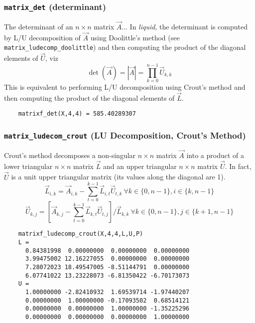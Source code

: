 \subsubsection{{\tt matrix\_det} (determinant)}
\label{module:matrix:det}
The determinant of an $n \times n$ matrix $\vec{A}$...
In {\it liquid}, the determinant is computed by L/U decomposition of $\vec{A}$
using Doolittle's method (see {\tt matrix\_ludecomp\_doolittle}) and then
computing the product of the diagonal elements of $\vec{U}$, viz
\[
    \det\left(\vec{A}\right) =
    \left|\vec{A}\right| =
    \prod_{k=0}^{n-1}{\vec{U}_{k,k}}
\]
This is equivalent to performing L/U decomposition using Crout's method and
then computing the product of the diagonal elements of $\vec{L}$.
\begin{verbatim}
    matrixf_det(X,4,4) = 585.40289307
\end{verbatim}

\subsubsection{{\tt matrix\_ludecom\_crout} (LU Decomposition, Crout's Method)}
\label{module:matrix:ludecomp_crout}
Crout's method decomposes a non-singular $n\times n$ matrix $\vec{A}$ into a
product of a lower triangular $n \times n$ matrix $\vec{L}$ and an upper
triangular $n \times n$ matrix $\vec{U}$. %
In fact, $\vec{U}$ is a unit upper triangular matrix (its values along the
diagonal are 1).
%
\[
    \vec{L}_{i,k} = \vec{A}_{i,k} -
                    \sum_{t=0}^{k-1}{ \vec{L}_{i,t} \vec{U}_{t,k} }
                    \ \forall k \in \{0,n-1\}, i \in \{k,n-1\}
\]
%
\[
    \vec{U}_{k,j} = \left[
                        \vec{A}_{k,j} -
                        \sum_{t=0}^{k-1}{ \vec{L}_{k,t} \vec{U}_{t,j} }
                    \right] / \vec{L}_{k,k}
                    \ \forall k \in \{0,n-1\}, j \in \{k+1,n-1\}
\]
%
\begin{verbatim}
    matrixf_ludecomp_crout(X,4,4,L,U,P)
    L =
      0.84381998  0.00000000  0.00000000  0.00000000
      3.99475002 12.16227055  0.00000000  0.00000000
      7.28072023 18.49547005 -8.51144791  0.00000000
      6.07741022 13.23228073 -6.81350422 -6.70173073
    U =
      1.00000000 -2.82410932  1.69539714 -1.97440207
      0.00000000  1.00000000 -0.17093502  0.68514121
      0.00000000  0.00000000  1.00000000 -1.35225296
      0.00000000  0.00000000  0.00000000  1.00000000
\end{verbatim}

